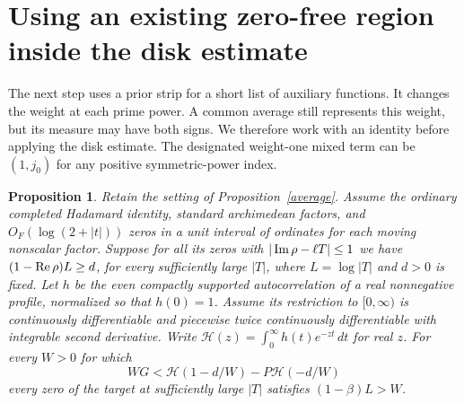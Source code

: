 \documentclass[11pt]{article}
\newtheorem{proposition}[theorem]{Proposition}\theoremstyle{definition}\newtheorem{definition}[theorem]{Definition}\newtheorem{remark}[theorem]{Remark}
\begin{document}
\section{Using an existing zero-free region inside the disk estimate}\label{sec:tilt}
The next step uses a prior strip for a short list of auxiliary functions. It changes the weight at each prime power. A common average still represents this weight, but its measure may have both signs. We therefore work with an identity before applying the disk estimate. The designated weight-one mixed term can be $(1,j_0)$ for any positive symmetric-power index.
\begin{proposition}\label{prop:tilt}
Retain the setting of Proposition~\ref{average}. Assume the ordinary completed Hadamard identity, standard archimedean factors, and $O_F(\log(2+|t|))$ zeros in a unit interval of ordinates for each moving nonscalar factor. Suppose for all its zeros with $|\operatorname{Im}\rho-\ell T|\le1$ we have $(1-\operatorname{Re}\rho)L\ge d$, for every sufficiently large $|T|$, where $L=\log|T|$ and $d>0$ is fixed. Let $h$ be the even compactly supported autocorrelation of a real nonnegative profile, normalized so that $h(0)=1$. Assume its restriction to $[0,\infty)$ is continuously differentiable and piecewise twice continuously differentiable with integrable second derivative. Write $\mathcal H(z)=\int_0^\infty h(t)e^{-zt}\,dt$ for real $z$. For every $W>0$ for which
\[
       WG<\mathcal H(1-d/W)-P\mathcal H(-d/W)
\]
every zero of the target at sufficiently large $|T|$ satisfies $(1-\beta)L>W$.
\end{proposition}
\end{document}
